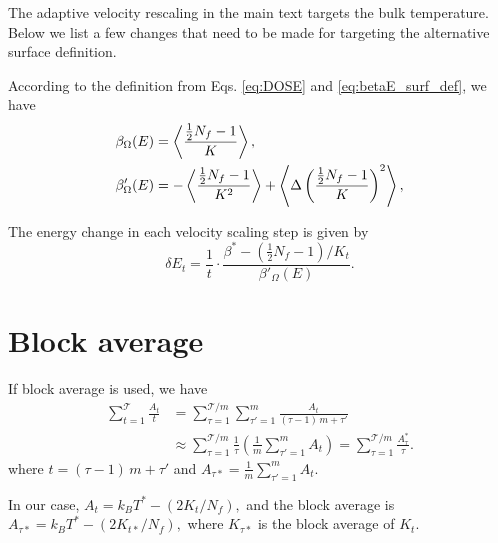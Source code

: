 \documentclass[reprint]{revtex4-1}
\begin{document}
The adaptive velocity rescaling in the main text
targets the bulk temperature.
%
Below we list a few changes that need to be made
for targeting the alternative surface definition.

According to the definition from
Eqs. \eqref{eq:DOSE} and \eqref{eq:betaE_surf_def},
we have
\begin{align}
  \beta_\Omega(E)
  &=
  \left\langle
    \frac{ \frac{1}{2}N_f - 1 } { K }
  \right\rangle
  ,
  \notag
  \\
  \beta'_\Omega(E)
  &=
  -
  \left\langle
    \frac{ \frac{1}{2} N_f - 1 } { K^2 }
  \right\rangle
  +
  \left\langle
    \Delta
    \left(
      \frac{ \frac{1}{2} N_f - 1 } { K }
    \right)^2
  \right\rangle
  ,
  \notag
\end{align}

The energy change in each velocity scaling step is given by
\begin{equation}
  \delta E_t
  =
  \frac{1}{t} \cdot
  \frac{ \beta^* - (\frac{1}{2} N_f - 1)/K_t }
  { \beta'_\Omega(E) }
  .
\end{equation}




\section{\label{sec:block}
Block average}

\newcommand{\tmax}{\mathcal T}

If block average is used, we have
%
\begin{align*}
  \sum_{t = 1}^{\tmax} \frac{ A_t } { t }
  &=
  \sum_{\tau = 1}^{\tmax/m}
  \sum_{\tau' = 1}^{m}
  \frac{ A_t } { (\tau - 1) \, m + \tau' }
  \\
  &\approx
  \sum_{\tau = 1}^{\tmax/m}
  \frac{ 1 } { \tau }
  \left(
    \frac 1 m
    \sum_{\tau' = 1}^m
    A_t
  \right)
  =
  \sum_{\tau = 1}^{\tmax/m}
  \frac{ A^*_\tau } { \tau }
  .
\end{align*}
%
where
$t = (\tau - 1) \, m + \tau'$
and
$
A_{\tau*} = \frac 1 m
\sum_{\tau' = 1}^m A_t.
$

In our case,
$
A_t = k_B T^* - \left( 2 K_t / N_f\right),
$
and the block average is
$
A_{\tau*}
= k_B T^* - \left( 2 K_{t*} / N_f\right),
$
where $K_{\tau*}$
is the block average of $K_t$.

%

\end{document}
